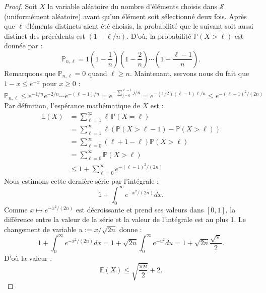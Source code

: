 \documentclass[a4paper, titlepage]{article}
\theoremstyle{definition}
\theoremstyle{remark}
\begin{document}
\begin{proof}
Soit $X$ la variable aléatoire du nombre d'éléments choisis dans $\mathcal S$ (uniformément aléatoire) avant qu'un élément soit sélectionné deux fois. Après que $\ell$ éléments distincts aient été choisis, la probabilité que le suivant soit aussi distinct des précédents est $(1-\ell/n)$. D'où, la probabilité $\mathbb{P}(X > \ell)$ est donnée par :
$$\mathbb{P}_{n,\ell} = 1\left(1-\frac{1}{n}\right)\left(1-\frac{2}{n}\right)\cdots\left(1-\frac{\ell-1}{n}\right).$$
Remarquons que $\mathbb{P}_{n,\ell} = 0$ quand $ \ell \geqslant n$. Maintenant, servons nous du fait que $1-x \leqslant e^{-x}$ pour $ x \geqslant 0$ :
$$\mathbb{P}_{n,\ell} \leqslant e^{-1/n}e^{-2/n}\cdots e^{-(\ell-1)/n} = e^{-\sum_{j=0}^{\ell -1} j/n} = e^{-(1/2)(\ell-1)\ell/n} \leqslant e^{-(\ell-1)^2/(2n)}$$
Par définition, l'espérance mathématique de $X$ est :
\begin{align*}
\mathbb{E}(X) &= \sum_{\ell = 1}^\infty \ell \, \mathbb{P}(X=\ell) \\
&= \sum_{\ell = 1}^\infty \ell \left(\mathbb{P}(X>\ell -1) - \mathbb{P}(X>\ell) \right)\\
&= \sum_{\ell = 0}^\infty (\ell + 1 -\ell)\mathbb{P}(X>\ell)\\
&= \sum_{\ell = 0}^\infty \mathbb{P}(X>\ell)\\
&\leqslant 1 + \sum_{\ell = 0}^\infty e^{-(\ell-1)^2/(2n)}
\end{align*}
Nous estimons cette dernière série par l'intégrale :
$$1 + \int_0^\infty e^{-x^2/(2n)}dx.$$
Comme $x \mapsto e^{-x^2/(2n)}$ est décroissante et prend ses valeurs dans $[0,1]$, la différence entre la valeur de la série et la valeur de l'intégrale est au plus 1. Le changement de variable $u := x/\sqrt{2n}$ donne :
$$1 + \int_0^\infty e^{-x^2/(2n)}dx = 1 + \sqrt{2n}\int_0^\infty e^{-u^2}du = 1 + \sqrt{2n}\frac{\sqrt{\pi}}{2}.$$
D'où la valeur :
$$\mathbb{E}(X) \leqslant \sqrt{\frac{\pi n}{2}} + 2.$$
\end{proof}

\newpage


\end{document}

